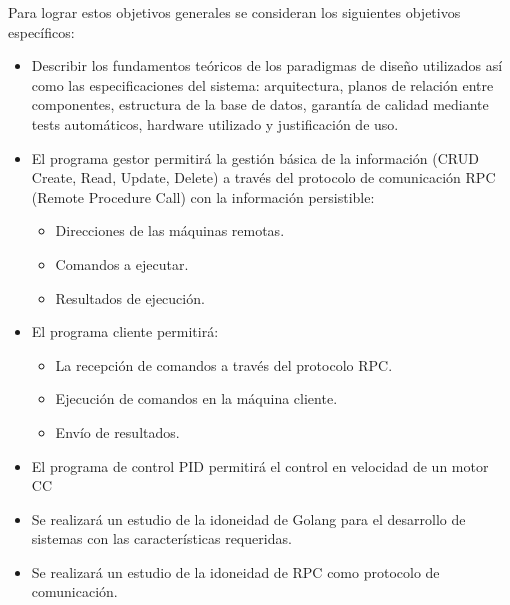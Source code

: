 Para lograr estos objetivos generales se consideran los siguientes objetivos específicos:
\begin{itemize}
    \item Describir los fundamentos teóricos de los paradigmas de diseño utilizados así como las especificaciones del sistema: arquitectura, planos de relación entre componentes, estructura de la base de datos, garantía de calidad mediante tests automáticos, hardware utilizado y justificación de uso.
    \item El programa gestor permitirá la gestión básica de la información (\gls{CRUD} Create, Read, Update, Delete) a través del protocolo de comunicación \gls{RPC} (Remote Procedure Call) con la información persistible:
    \begin{itemize}
        \item Direcciones de las máquinas remotas.
        \item Comandos a ejecutar.
        \item Resultados de ejecución.
    \end{itemize}
    \item El programa cliente permitirá:
    \begin{itemize}
        \item La recepción de comandos a través del protocolo RPC\@.
        \item Ejecución de comandos en la máquina cliente.
        \item Envío de resultados.
    \end{itemize}
    \item El programa de control PID permitirá el control en velocidad de un motor CC
    \item Se realizará un estudio de la idoneidad de Golang para el desarrollo de sistemas con las características requeridas.
    \item Se realizará un estudio de la idoneidad de RPC como protocolo de comunicación.
\end{itemize}
